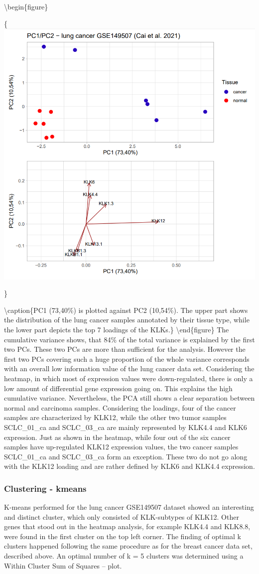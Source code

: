 \documentclass[
]{article}
\begin{document}
\textbackslash begin\{figure\}

\{\centering \includegraphics[width=0.5\linewidth]{images/PCAplot_lung}

\}

\textbackslash caption\{PC1 (73,40\%) is plotted against PC2 (10,54\%).
The upper part shows the distribution of the lung cancer samples
annotated by their tissue type, while the lower part depicts the top 7
loadings of the KLKs.\}\label{fig:PCA plot - lung }
\textbackslash end\{figure\} The cumulative variance shows, that 84\% of
the total variance is explained by the first two PCs. These two PCs are
more than sufficient for the analysis. However the first two PCs
covering such a huge proportion of the whole variance corresponds with
an overall low information value of the lung cancer data set.
Considering the heatmap, in which most of expression values were
down-regulated, there is only a low amount of differential gene
expression going on. This explains the high cumulative variance.
Nevertheless, the PCA still shows a clear separation between normal and
carcinoma samples. Considering the loadings, four of the cancer samples
are characterized by KLK12, while the other two tumor samples
SCLC\_01\_ca and SCLC\_03\_ca are mainly represented by KLK4.4 and KLK6
expression. Just as shown in the heatmap, while four out of the six
cancer samples have up-regulated KLK12 expression values, the two cancer
samples SCLC\_01\_ca and SCLC\_03\_ca form an exception. These two do
not go along with the KLK12 loading and are rather defined by KLK6 and
KLK4.4 expression.

\hypertarget{clustering---kmeans}{%
\subsubsection{Clustering - kmeans}\label{clustering---kmeans}}

K-means performed for the lung cancer GSE149507 dataset showed an
interesting and distinct cluster, which only consisted of KLK-subtypes
of KLK12. Other genes that stood out in the heatmap analysis, for
example KLK4.4 and KLK8.8, were found in the first cluster on the top
left corner. The finding of optimal k clusters happened following the
same procedure as for the breast cancer data set, described above. An
optimal number of k = 5 clusters was determined using a Within Cluster
Sum of Squares -- plot.
\end{document}
